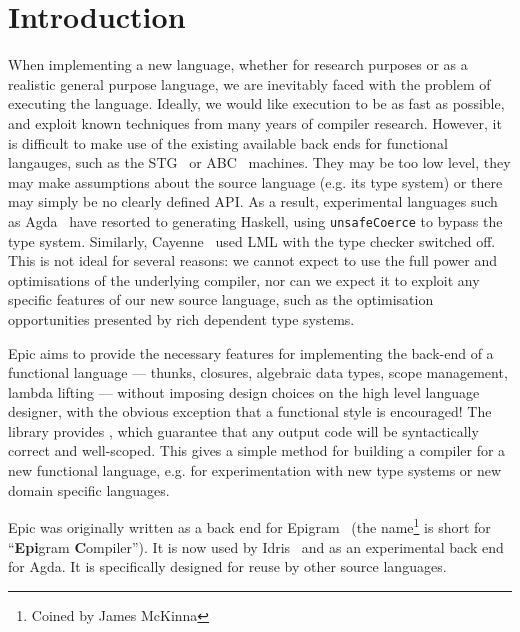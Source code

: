 \section{Introduction}

When implementing a new language, whether for research purposes or as
a realistic general purpose language, we are inevitably faced with the
problem of executing the language. Ideally, we would like execution to
be as fast as possible, and exploit known techniques from many years
of compiler research. However, it is difficult to make use of the
existing available back ends for functional langauges, such as the
STG~\cite{evalpush,stg,llvm-haskell} or ABC~\cite{abc-machine}
machines. They may be too low level, they may make assumptions about
the source language (e.g. its type system) or there may simply be no
clearly defined API. As a result, experimental languages such as
Agda~\cite{norell-thesis} have resorted to generating Haskell, using
\texttt{unsafeCoerce} to bypass the type system. Similarly,
Cayenne~\cite{cayenne-icfp} used LML with the type checker switched
off. This is not ideal for several reasons: we cannot expect to use
the full power and optimisations of the underlying compiler, nor can
we expect it to exploit any specific features of our new source
language, such as the optimisation opportunities presented by rich
dependent type systems.

Epic aims to provide the necessary features for implementing the
back-end of a functional language --- thunks, closures, algebraic data
types, scope management, lambda lifting --- without imposing
 design choices on the high level language designer, with
the obvious exception that a functional style is encouraged!  The
library provides , which guarantee that
any output code will be syntactically correct and well-scoped.  This
gives a simple method for building a compiler for a new functional
language, e.g. for experimentation with new type systems or new domain
specific languages.

Epic was originally written as a back end for
Epigram~\cite{levitation} (the name\footnote{Coined by James McKinna}
is short for ``\textbf{Epi}gram \textbf{C}ompiler''). It is now used
by Idris~\cite{idris-plpv} and as an experimental back end for
Agda. It is specifically designed for reuse by other source languages.



